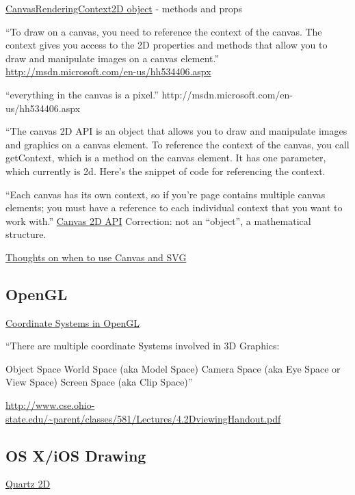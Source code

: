 \documentclass[reqno,12pt]{tufte-handout}
\numberwithin{equation}{subsection}
\numberwithin{equation}{subsection}
\begin{document}
\begin{appendices}
\href{http://msdn.microsoft.com/en-us/library/ff975057.aspx}{CanvasRenderingContext2D object} - methods and props

``To draw on a canvas, you need to reference the context of the canvas.  The context gives you access to the 2D properties and methods that allow you to draw and manipulate images on a canvas element.'' \url{http://msdn.microsoft.com/en-us/hh534406.aspx}

``everything in the canvas is a pixel.'' http://msdn.microsoft.com/en-us/hh534406.aspx

``The canvas 2D API is an object that allows you to draw and
manipulate images and graphics on a canvas element.  To reference the context of the canvas, you call getContext, which is a method on the canvas element.  It has one parameter, which currently is 2d.  Here’s the snippet of code for referencing the context.

``Each canvas has its own context, so if you’re page contains multiple canvas elements; you must have a reference to each individual context that you want to work with.'' \url{Canvas 2D
 API}  Correction: not an ``object'', a mathematical structure.

\href{http://blogs.msdn.com/b/ie/archive/2011/04/22/thoughts-on-when-to-use-canvas-and-svg.aspx}{Thoughts on when to use Canvas and SVG}

\subsection{OpenGL}
\label{subs:opengl}


\href{http://www.matrix44.net/cms/notes/opengl-3d-graphics/coordinate-systems-in-opengl}{Coordinate Systems in OpenGL}

``There are multiple coordinate Systems involved in 3D Graphics:

Object Space
World Space (aka Model Space)
Camera Space (aka Eye Space or View Space)
Screen Space (aka Clip Space)''

\url{http://www.cse.ohio-state.edu/~parent/classes/581/Lectures/4.2DviewingHandout.pdf}

\subsection{OS X/iOS Drawing}

\href{https://developer.apple.com/library/mac/documentation/graphicsimaging/conceptual/drawingwithquartz2d/dq\_overview/dq\_overview.html}{Quartz 2D}


\end{appendices}
\end{document}
